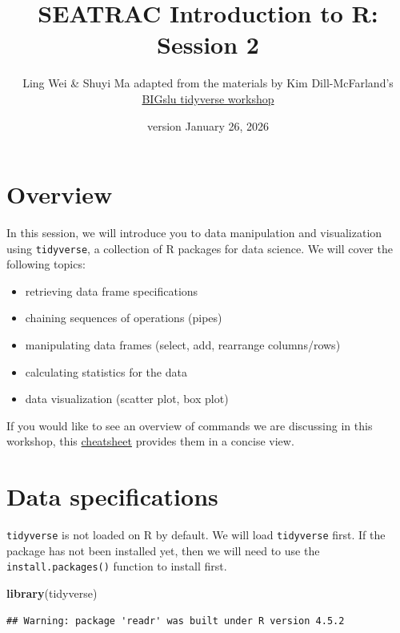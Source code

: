 \documentclass[
]{article}
\title{SEATRAC Introduction to R: Session 2}
\author{Ling Wei \& Shuyi Ma \textbar{} adapted from the materials by
Kim Dill-McFarland's
\href{https://bigslu.github.io/workshops/2022.08.15_R.tidyverse.workshop/2_tidyverse.html\#2_Introduction_to_the_tidyverse}{BIGslu
tidyverse workshop}}
\date{version January 26, 2026}
\newenvironment{Shaded}{\begin{snugshade}}{\end{snugshade}}
\newcommand{\FunctionTok}[1]{\textcolor[rgb]{0.13,0.29,0.53}{\textbf{#1}}}
\newcommand{\NormalTok}[1]{#1}
\providecommand{\tightlist}{%
  \setlength{\itemsep}{0pt}\setlength{\parskip}{0pt}}
\begin{document}
\maketitle

\section{Overview}\label{overview}

In this session, we will introduce you to data manipulation and
visualization using \texttt{tidyverse}, a collection of R packages for
data science. We will cover the following topics:

\begin{itemize}
\tightlist
\item
  retrieving data frame specifications
\item
  chaining sequences of operations (pipes)
\item
  manipulating data frames (select, add, rearrange columns/rows)
\item
  calculating statistics for the data
\item
  data visualization (scatter plot, box plot)
\end{itemize}

If you would like to see an overview of commands we are discussing in
this workshop, this
\href{https://ma-lab-seattle-childrens-cgidr.github.io/SEATRAC_Rintro/Session2_cheatsheet2.html}{cheatsheet}
provides them in a concise view.

\section{Data specifications}\label{data-specifications}

\texttt{tidyverse} is not loaded on R by default. We will load
\texttt{tidyverse} first. If the package has not been installed yet,
then we will need to use the \texttt{install.packages()} function to
install first.

\begin{Shaded}
\begin{Highlighting}[]
\FunctionTok{library}\NormalTok{(tidyverse)}
\end{Highlighting}
\end{Shaded}

\begin{verbatim}
## Warning: package 'readr' was built under R version 4.5.2
\end{verbatim}
\end{document}
